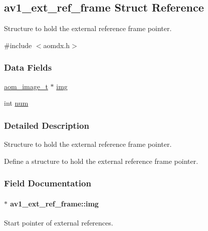 \hypertarget{structav1__ext__ref__frame}{}\subsection{av1\+\_\+ext\+\_\+ref\+\_\+frame Struct Reference}
\label{structav1__ext__ref__frame}


Structure to hold the external reference frame pointer.  




{\ttfamily \#include $<$aomdx.\+h$>$}

\subsubsection*{Data Fields}
\begin{DoxyCompactItemize}
\item 
\hyperlink{aom__image_8h_a5409ae8fdb326fe1cc32622ef4e23748}{aom\+\_\+image\+\_\+t} $\ast$ \hyperlink{structav1__ext__ref__frame_af511f04e9cb8a571b3516eee61414f85}{img}
\item 
int \hyperlink{structav1__ext__ref__frame_a2d249bb9aee60c4b6c67e64b1694bc2f}{num}
\end{DoxyCompactItemize}


\subsubsection{Detailed Description}
Structure to hold the external reference frame pointer. 

Define a structure to hold the external reference frame pointer. 

\subsubsection{Field Documentation}
\paragraph[{\texorpdfstring{img}{img}}]{$\ast$ av1\+\_\+ext\+\_\+ref\+\_\+frame\+::img}\hypertarget{structav1__ext__ref__frame_af511f04e9cb8a571b3516eee61414f85}{}\label{structav1__ext__ref__frame_af511f04e9cb8a571b3516eee61414f85}
Start pointer of external references. 
